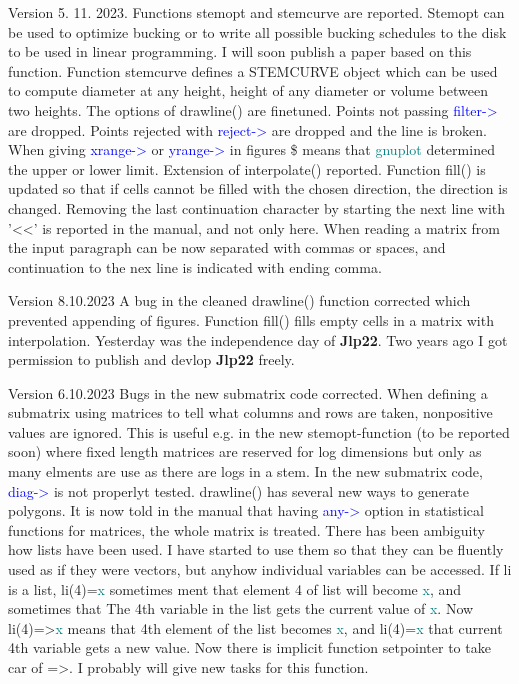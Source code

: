 Version 5. 11. 2023. Functions stemopt and stemcurve are reported. Stemopt can be used to optimize bucking or to write 
all possible bucking schedules to the disk to be used in linear programming. I will soon 
publish a paper based on this function. Function stemcurve defines a STEMCURVE object which can be used 
to compute diameter at any height, height of any diameter or volume between two heights. The options of \textcolor{VioletRed}{drawline}() are finetuned. Points not passing \textcolor{blue}{filter->} are dropped. 
Points rejected with \textcolor{blue}{reject->} are dropped and the line is broken. When giving \textcolor{blue}{xrange->} or \textcolor{blue}{yrange->} 
in figures \$ means that \textcolor{teal}{gnuplot} determined the upper or lower limit. Extension of \textcolor{VioletRed}{interpolate}() reported. 
Function \textcolor{VioletRed}{fill}() is updated so that if cells cannot be filled with the chosen direction, 
the direction is changed. Removing the last continuation character by starting the next 
line with '<<' is reported in the manual, and not only here. When reading a matrix from the input paragraph can be now 
separated with commas or spaces, and continuation to the nex line is indicated with ending comma. 
 
Version 8.10.2023 A bug in the cleaned \textcolor{VioletRed}{drawline}() function corrected which prevented appending of 
figures. Function \textcolor{VioletRed}{fill}() fills empty cells in a matrix with interpolation. 
Yesterday was the independence day of \textbf{Jlp22}. Two years ago I got permission to publish 
and devlop \textbf{Jlp22} freely. 
 
Version 6.10.2023 Bugs in the new submatrix code corrected. When defining a submatrix using matrices to tell 
what columns and rows are taken, nonpositive values are ignored. This is useful e.g. in the new stemopt-function (to be reported soon) 
where fixed length matrices are reserved for log dimensions but only as many elments are use 
as there are logs in a stem. In the new submatrix code, \textcolor{blue}{diag->} is not properlyt tested. 
\textcolor{VioletRed}{drawline}() has several new ways to generate polygons. It is now told in the manual that 
having \textcolor{blue}{any->} option in statistical functions for matrices, the whole matrix is treated. 
There has been ambiguity how lists have been used. I have started to use them so that 
they can be fluently used as if they were vectors, but anyhow individual variables can be accessed. 
If li is a list, li(4)=\textcolor{teal}{x} sometimes ment that element 4 of list will become \textcolor{teal}{x}, and sometimes that 
The 4th variable in the list gets the current value of \textcolor{teal}{x}. Now li(4)=>\textcolor{teal}{x} means that 4th 
element of the list becomes \textcolor{teal}{x}, and li(4)=\textcolor{teal}{x} that current 4th variable gets a new value. 
Now there is implicit function setpointer to take car of =>. 
I probably will give new tasks for this function. 
 
